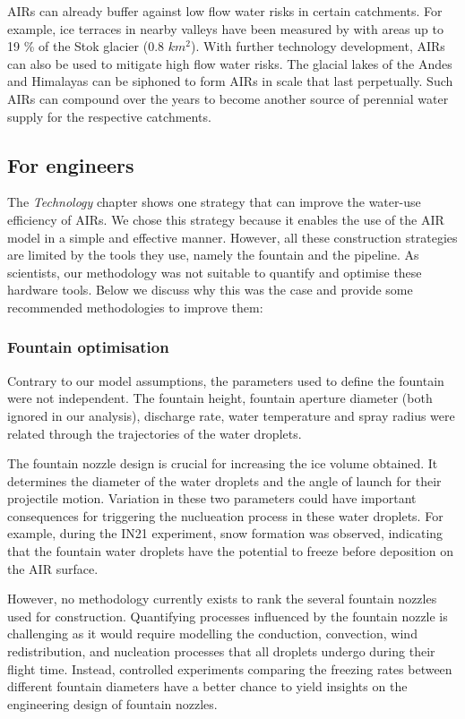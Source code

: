 \ac{AIRs} can already buffer against low flow water risks in certain catchments. For example, ice terraces in
nearby valleys have been measured by \citet{nusserSociohydrologyArtificialGlaciers2019} with areas up to 19 \%
of the Stok glacier (0.8 $km^2$). With further technology development, AIRs can also be used to mitigate high
flow water risks. The glacial lakes of the Andes and Himalayas can be siphoned to form AIRs in scale that last
perpetually. Such AIRs can compound over the years to become another source of perennial water supply for the
respective catchments.

\subsection{For engineers}

The \textit{Technology} chapter shows one strategy that can improve the water-use efficiency of \ac{AIRs}. We chose
this strategy because it enables the use of the \ac{AIR} model in a simple and effective manner. However, all these
construction strategies are limited by the tools they use, namely the fountain and the pipeline. As scientists,
our methodology was not suitable to quantify and optimise these hardware tools. Below we discuss why this was
the case and provide some recommended methodologies to improve them:

\subsubsection{Fountain optimisation}

Contrary to our model assumptions, the parameters used to define the fountain were not independent. The fountain
height, fountain aperture diameter (both ignored in our analysis), discharge rate, water temperature and spray
radius were related through the trajectories of the water droplets.

The fountain nozzle design is crucial for increasing the ice volume obtained. It determines the diameter of the
water droplets and the angle of launch for their projectile motion. Variation in these two parameters could have
important consequences for triggering the nuclueation process in these water droplets. For example, during the IN21
experiment, snow formation was observed, indicating that the fountain water droplets have the potential to
freeze before deposition on the AIR surface. 

However, no methodology currently exists to rank the several fountain nozzles used for construction. Quantifying
processes influenced by the fountain nozzle is challenging as it would require modelling the conduction,
convection, wind redistribution, and nucleation processes that all droplets undergo during their flight time.
Instead, controlled experiments comparing the freezing rates between different fountain diameters have a better
chance to yield insights on the engineering design of fountain nozzles.

